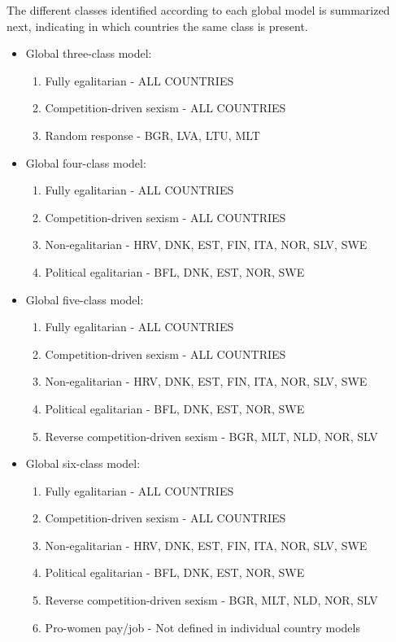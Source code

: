 \documentclass[12pt,a4paper,oneside]{reedthesis}
\providecommand{\tightlist}{%
  \setlength{\itemsep}{0pt}\setlength{\parskip}{0pt}}
\begin{document}
The different classes identified according to each global model is summarized next, indicating in which countries the same class is present.
\begin{itemize}
\tightlist
\item
  Global three-class model:
  \begin{enumerate}
  \def\labelenumi{\arabic{enumi}.}
  \tightlist
  \item
    Fully egalitarian - ALL COUNTRIES
  \item
    Competition-driven sexism - ALL COUNTRIES
  \item
    Random response - BGR, LVA, LTU, MLT
  \end{enumerate}
\item
  Global four-class model:
  \begin{enumerate}
  \def\labelenumi{\arabic{enumi}.}
  \tightlist
  \item
    Fully egalitarian - ALL COUNTRIES
  \item
    Competition-driven sexism - ALL COUNTRIES
  \item
    Non-egalitarian - HRV, DNK, EST, FIN, ITA, NOR, SLV, SWE
  \item
    Political egalitarian - BFL, DNK, EST, NOR, SWE
  \end{enumerate}
\item
  Global five-class model:
  \begin{enumerate}
  \def\labelenumi{\arabic{enumi}.}
  \tightlist
  \item
    Fully egalitarian - ALL COUNTRIES
  \item
    Competition-driven sexism - ALL COUNTRIES
  \item
    Non-egalitarian - HRV, DNK, EST, FIN, ITA, NOR, SLV, SWE
  \item
    Political egalitarian - BFL, DNK, EST, NOR, SWE
  \item
    Reverse competition-driven sexism - BGR, MLT, NLD, NOR, SLV
  \end{enumerate}
\item
  Global six-class model:
  \begin{enumerate}
  \def\labelenumi{\arabic{enumi}.}
  \tightlist
  \item
    Fully egalitarian - ALL COUNTRIES
  \item
    Competition-driven sexism - ALL COUNTRIES
  \item
    Non-egalitarian - HRV, DNK, EST, FIN, ITA, NOR, SLV, SWE
  \item
    Political egalitarian - BFL, DNK, EST, NOR, SWE
  \item
    Reverse competition-driven sexism - BGR, MLT, NLD, NOR, SLV
  \item
    Pro-women pay/job - Not defined in individual country models
  \end{enumerate}
\end{itemize}
\end{document}

